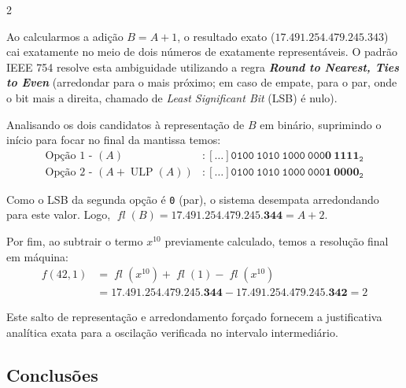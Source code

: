 \documentclass[a0,portrait]{a0poster}
\DeclareMathOperator{\ulp}{ULP}
\DeclareMathOperator{\fl}{\textit{fl}}
\begin{document}
\begin{multicols}{2}
\begin{justify}
    Ao calcularmos a adição $B = A + 1$, o resultado exato
    ($17.491.254.479.245.343$) cai exatamente no meio de dois números de exatamente
    representáveis. O padrão IEEE 754 resolve esta ambiguidade utilizando a regra
    \textbf{\textit{Round to Nearest, Ties to Even}} (arredondar para o mais
    próximo; em caso de empate, para o par, onde o bit mais a direita, chamado de
    \textit{Least Significant Bit } (LSB) é nulo).

    Analisando os dois candidatos à representação de $B$ em binário, suprimindo o
    início para focar no final da mantissa temos:
    \begin{align*}
      \text{Opção 1 - } (A)         & : \mathtt{[\dots] 0100 \ 1010 \ 1000 \ 000\mathbf{0 \ 1111}_2} \\
      \text{Opção 2 - } (A+\ulp(A)) & : \mathtt{[\dots] 0100 \ 1010 \ 1000 \ 000\mathbf{1 \ 0000}_2}
    \end{align*}

    Como o LSB da segunda opção é \texttt{0} (par), o sistema desempata
    arredondando para este valor. Logo, $\fl(B) = 17.491.254.479.245.\textbf{344} =
      A + 2$.

    Por fim, ao subtrair o termo $x^{10}$ previamente calculado, temos a resolução
    final em máquina:
    \begin{align*}
      f(42,1) & = \fl(x^{10}) + \fl(1) - \fl(x^{10})                                    \\
              & = 17.491.254.479.245.\textbf{344} - 17.491.254.479.245.\textbf{342} = 2
    \end{align*}

    Este salto de representação e arredondamento forçado fornecem a justificativa
    analítica exata para a oscilação verificada no intervalo intermediário.
  \end{justify}

  \vspace{-2.5cm}
  \color{SaddleBrown} %
  \begin{center}
    \section*{Conclus\~oes}
  \end{center}


\end{multicols}
\end{document}
